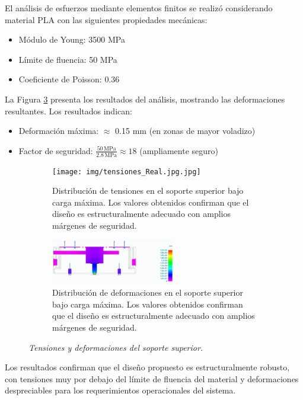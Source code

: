El análisis de esfuerzos mediante elementos finitos se realizó considerando material PLA con las siguientes propiedades mecánicas:

\begin{itemize}[label=$\bullet$]
    \item Módulo de Young: 3500 MPa
    \item Límite de fluencia: 50 MPa
    \item Coeficiente de Poisson: 0.36
\end{itemize}

La Figura \ref{fig:SuperiorReal_simplificado_tensiones} presenta los resultados del análisis, mostrando las deformaciones resultantes. Los resultados indican:

\begin{itemize}[label=$\bullet$]
    \item Deformación máxima: $\approx$ 0.15 mm (en zonas de mayor voladizo)
    \item Factor de seguridad: $\frac{50\,\text{MPa}}{2.8\,\text{MPa}} \approx 18$ (ampliamente seguro)
\end{itemize}

\begin{figure}[H]
    
\end{figure}
\begin{figure}[H]
    \centering
    \begin{subfigure}{0.35\textwidth}
        \centering
    \texttt{[image: img/tensiones\_Real.jpg.jpg]}
    \caption{Distribución de tensiones en el soporte superior bajo carga máxima. Los valores obtenidos confirman que el diseño es estructuralmente adecuado con amplios márgenes de seguridad.}
    \label{fig:tensiones_Real}
    \end{subfigure}
    \hspace{0.5cm}
    \begin{subfigure}{0.35\textwidth}
        \centering
    \includegraphics[width=0.6\textwidth]{img/SuperiorReal_simplificado_tensiones.jpg}
    \caption{Distribución de deformaciones en el soporte superior bajo carga máxima. Los valores obtenidos confirman que el diseño es estructuralmente adecuado con amplios márgenes de seguridad.}
    \label{fig:SuperiorReal_simplificado_tensiones}
    \end{subfigure}
    \caption{\textit{Tensiones y deformaciones del soporte superior.}}
\end{figure}
Los resultados confirman que el diseño propuesto es estructuralmente robusto, con tensiones muy por debajo del límite de fluencia del material y deformaciones despreciables para los requerimientos operacionales del sistema.

